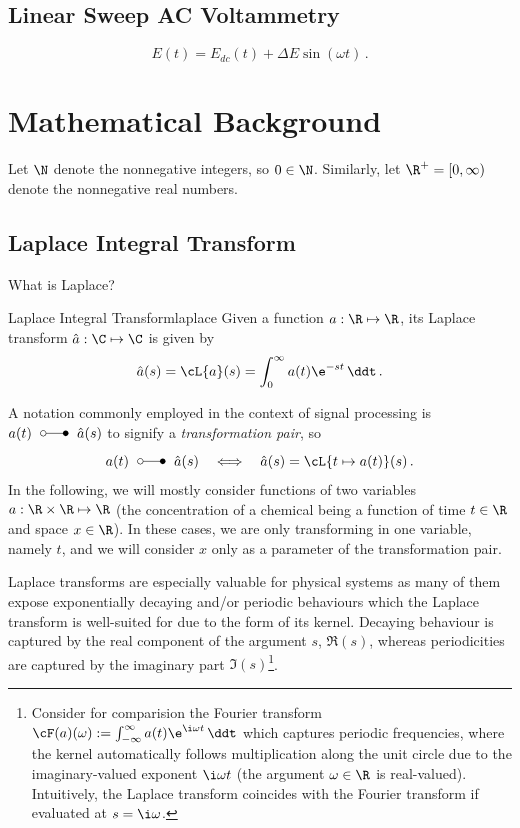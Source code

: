 \documentclass{prettytex/ox/mmsc-special-topic}
\begin{document}
  \subsection{Linear Sweep AC Voltammetry}
  \begin{equation}
    E(t) = E_{dc}(t) + \Delta E \sin(\omega t)\,.
    \label{eq:ac-potential}
  \end{equation}

  \section{Mathematical Background}
  Let $\N$ denote the nonnegative integers, so $0 \in \N$.
  Similarly, let $\R^+ = [0, \infty)$ denote the nonnegative real numbers.

  \subsection{Laplace Integral Transform}
  What is Laplace?

  \begin{definition}{Laplace Integral Transform}{laplace}
    Given a function $a: \R \mapsto \R$, its Laplace transform $\hat{a}: \C \mapsto \C$ is given by
    $$\hat{a}(s) = \cL\{a\}(s) = \int_{0}^{\infty} a(t) \e^{-st} \,\ddt\,.$$
  \end{definition}

  A notation commonly employed in the context of signal processing is $a(t) \;\laplace\; \hat{a}(s)$ to signify a \textit{transformation pair}, so
  $$a(t) \;\laplace\; \hat{a}(s) \quad\Longleftrightarrow\quad \hat{a}(s) = \cL\{t \mapsto a(t)\}(s)\,.$$
  In the following, we will mostly consider functions of two variables $a: \R \times \R \mapsto \R$ (the concentration of a chemical being a function of time $t \in \R$ and space $x \in \R$).
  In these cases, we are only transforming in one variable, namely $t$, and we will consider $x$ only as a parameter of the transformation pair.

  Laplace transforms are especially valuable for physical systems as many of them expose exponentially decaying and/or periodic behaviours which the Laplace transform is well-suited for due to the form of its kernel.
  Decaying behaviour is captured by the real component of the argument $s$, $\Re(s)$, whereas periodicities are captured by the imaginary part $\Im(s)$\footnote{Consider for comparision the Fourier transform $\cF(a)(\omega) := \int_{-\infty}^{\infty} a(t) \e^{\i \omega t} \,\ddt$ which captures periodic frequencies, where the kernel automatically follows multiplication along the unit circle due to the imaginary-valued exponent $\i\omega t$ (the argument $\omega \in \R$ is real-valued). Intuitively, the Laplace transform coincides with the Fourier transform if evaluated at $s = \i \omega$.}.
\end{document}

